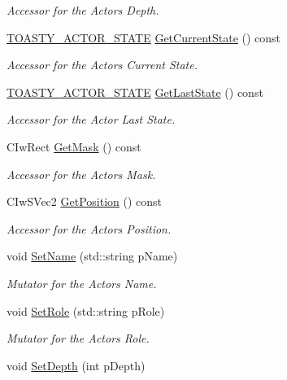 \begin{DoxyCompactItemize}
\begin{DoxyCompactList}\small\item\em Accessor for the Actors Depth. \end{DoxyCompactList}\item 
\hyperlink{_ty_actor_8h_aceba83227db82b051b04ff8e90d63a51}{TOASTY\_\-ACTOR\_\-STATE} \hyperlink{class_i_ty_actor_adc9729b29f07da02bbfa26d423901b45}{GetCurrentState} () const 
\begin{DoxyCompactList}\small\item\em Accessor for the Actors Current State. \end{DoxyCompactList}\item 
\hyperlink{_ty_actor_8h_aceba83227db82b051b04ff8e90d63a51}{TOASTY\_\-ACTOR\_\-STATE} \hyperlink{class_i_ty_actor_ab1c7d4089d543bf258e02854c00969f0}{GetLastState} () const 
\begin{DoxyCompactList}\small\item\em Accessor for the Actor Last State. \end{DoxyCompactList}\item 
CIwRect \hyperlink{class_i_ty_actor_a029053700af64bae8290b5dcfa04ceec}{GetMask} () const 
\begin{DoxyCompactList}\small\item\em Accessor for the Actors Mask. \end{DoxyCompactList}\item 
CIwSVec2 \hyperlink{class_i_ty_actor_a545fb58ad751ccbc8a33729ede2b7415}{GetPosition} () const 
\begin{DoxyCompactList}\small\item\em Accessor for the Actors Position. \end{DoxyCompactList}\item 
void \hyperlink{class_i_ty_actor_a3ecdf0c6c1502c4b5a4a7227811ad0e3}{SetName} (std::string pName)
\begin{DoxyCompactList}\small\item\em Mutator for the Actors Name. \end{DoxyCompactList}\item 
void \hyperlink{class_i_ty_actor_abbf80ab3261ea1ffa4a83e8958f486bd}{SetRole} (std::string pRole)
\begin{DoxyCompactList}\small\item\em Mutator for the Actors Role. \end{DoxyCompactList}\item 
void \hyperlink{class_i_ty_actor_a23072345bc259b4a18c702238e3f9249}{SetDepth} (int pDepth)

\end{DoxyCompactItemize}
